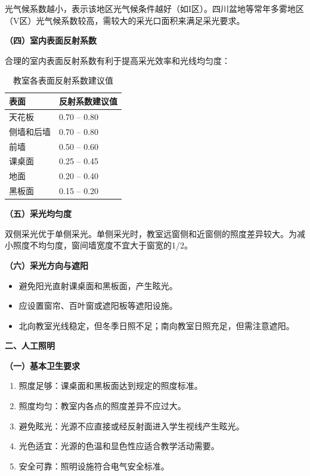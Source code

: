 \begin{keybox}
光气候系数越小，表示该地区光气候条件越好（如I区）。四川盆地等常年多雾地区（V区）光气候系数较高，需较大的采光口面积来满足采光要求。

\textbf{（四）室内表面反射系数}

合理的室内表面反射系数有利于提高采光效率和光线均匀度：

\begin{table}[H]
\centering
\caption{教室各表面反射系数建议值}
\begin{tabularx}{\textwidth}{lX}
\hline
\textbf{表面} & \textbf{反射系数建议值} \\
\hline
天花板 & 0.70 -- 0.80 \\
侧墙和后墙 & 0.70 -- 0.80 \\
前墙 & 0.50 -- 0.60 \\
课桌面 & 0.25 -- 0.45 \\
地面 & 0.20 -- 0.40 \\
黑板面 & 0.15 -- 0.20 \\
\hline
\end{tabularx}
\end{table}

\textbf{（五）采光均匀度}

双侧采光优于单侧采光。单侧采光时，教室远窗侧和近窗侧的照度差异较大。为减小照度不均匀度，窗间墙宽度不宜大于窗宽的1/2。

\textbf{（六）采光方向与遮阳}

\begin{itemize}[leftmargin=*]
    \item 避免阳光直射课桌面和黑板面，产生眩光。
    \item 应设置窗帘、百叶窗或遮阳板等遮阳设施。
    \item 北向教室光线稳定，但冬季日照不足；南向教室日照充足，但需注意遮阳。
\end{itemize}

\textbf{二、人工照明}

\textbf{（一）基本卫生要求}

\begin{enumerate}[leftmargin=*]
    \item 照度足够：课桌面和黑板面达到规定的照度标准。
    \item 照度均匀：教室内各点的照度差异不应过大。
    \item 避免眩光：光源不应直接或经反射面进入学生视线产生眩光。
    \item 光色适宜：光源的色温和显色性应适合教学活动需要。
    \item 安全可靠：照明设施符合电气安全标准。
\end{enumerate}


\end{keybox}
